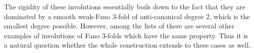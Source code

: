 \documentclass[JEP,XML,SOM,Unicode,published]{cedram}
\theoremstyle{plain}
\theoremstyle{definition}
\begin{document}
The rigidity of these involutions essentially boils down to the fact that they are dominated by a smooth weak-Fano $3$-fold of anti-canonical degree $2$, which is the smallest degree possible. However, among the lists of \cite{Cutrone-Marshburn} there are several other examples of involutions of Fano $3$-folds which have the same property. Thus it is a natural question whether the whole construction extends to these cases as well.

\backmatter


\vspace*{-\baselineskip}
\enlargethispage{\baselineskip}
\end{document}
